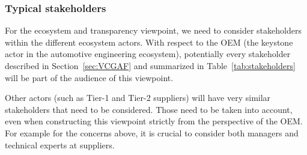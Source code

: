 \subsubsection{Typical stakeholders} 
For the ecosystem and transparency viewpoint, we need to consider stakeholders within the different ecosystem actors.
With respect to the OEM (the keystone actor in the automotive engineering ecosystem), potentially every stakeholder described in Section~\ref{sec:VCGAF} and summarized in Table~\ref{tab:stakeholders} will be part of the audience of this viewpoint. 

Other actors (such as Tier-1 and Tier-2 suppliers) will have very similar stakeholders that need to be considered. 
Those need to be taken into account, even when constructing this viewpoint strictly from the perspective of the OEM. 
For example for the concerns above, it is crucial to consider both managers and technical experts at suppliers.





